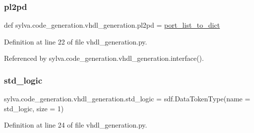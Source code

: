 \subsubsection{\texorpdfstring{pl2pd}{pl2pd}}
{\footnotesize\ttfamily def sylva.\+code\+\_\+generation.\+vhdl\+\_\+generation.\+pl2pd = \hyperlink{namespacesylva_1_1code__generation_1_1vhdl__generation_a51a60df4116e05e838a7d6c61f434df5}{port\+\_\+list\+\_\+to\+\_\+dict}}



Definition at line 22 of file vhdl\+\_\+generation.\+py.



Referenced by sylva.\+code\+\_\+generation.\+vhdl\+\_\+generation.\+interface().

\mbox{\label{namespacesylva_1_1code__generation_1_1vhdl__generation_a85e74939ca684a8a978805b5918467c8}} 
\subsubsection{\texorpdfstring{std\+\_\+logic}{std\_logic}}
{\footnotesize\ttfamily sylva.\+code\+\_\+generation.\+vhdl\+\_\+generation.\+std\+\_\+logic = sdf.\+Data\+Token\+Type(name = \textquotesingle{}std\+\_\+logic\textquotesingle{}, size = 1)}



Definition at line 24 of file vhdl\+\_\+generation.\+py.

